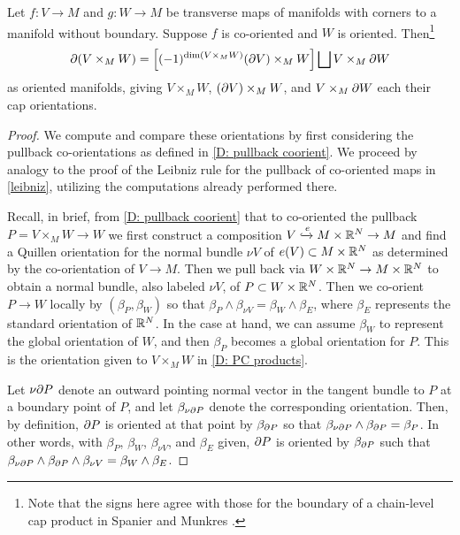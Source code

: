\begin{proposition}\label{P: Leibniz cap}
	Let $f \colon V \to M$ and $g \colon W \to M$ be transverse maps of manifolds with corners to a manifold without boundary.
	Suppose $f$ is co-oriented and $W$ is oriented.
	Then\footnote{Note that the signs here agree with those for the boundary of a chain-level cap product in Spanier \cite[Section 5.6.15]{Span81} and Munkres \cite[Section 66]{Mun84}.} $$\partial(V \times_M W) = \left[(-1)^{\dim(V \times_M W)} (\partial V) \times_M W\right] \bigsqcup V \times_M \partial W$$
	as oriented manifolds, giving $V \times_M W$, $(\partial V) \times_M W$, and $V \times_M \partial W$ each their cap orientations.
\end{proposition}

\begin{proof}
	We compute and compare these orientations by first considering the pullback co-orientations as defined in \cref{D: pullback coorient}.
	We proceed by analogy to the proof of the Leibniz rule for the pullback of co-oriented maps in \cref{leibniz}, utilizing the computations already performed there.

	Recall, in brief, from \cref{D: pullback coorient} that to co-oriented the pullback $P = V \times_M W \to W$ we first construct a composition $V \xhookrightarrow{e} M \times \mathbb{R}^N \to M$ and find a Quillen orientation for the normal bundle $\nu V$ of $e(V) \subset M \times \mathbb{R}^N$ as determined by the co-orientation of $V \to M$.
	Then we pull back via $W \times \mathbb{R}^N \to M \times \mathbb{R}^N$ to obtain a normal bundle, also labeled $\nu V$, of $P \subset W \times \mathbb{R}^N$.
	Then we co-orient $P \to W$ locally by $(\beta_P,\beta_W)$ so that $\beta_P \wedge \beta_{\nu V} = \beta_W \wedge \beta_E$, where $\beta_E$ represents the standard orientation of $\mathbb{R}^N$.
	In the case at hand, we can assume $\beta_W$ to represent the global orientation of $W$, and then $\beta_P$ becomes a global orientation for $P$.
	This is the orientation given to $V \times_M W$ in \cref{D: PC products}.

	Let $\nu\partial P$ denote an outward pointing normal vector in the tangent bundle to $P$ at a boundary point of $P$, and let $\beta_{\nu\partial P}$ denote the corresponding orientation.
	Then, by definition, $\partial P$ is oriented at that point by $\beta_{\partial P}$ so that $\beta_{\nu\partial P} \wedge \beta_{\partial P} = \beta_P$.
	In other words, with $\beta_P$, $\beta_W$, $\beta_{\nu V}$, and $\beta_E$ given, $\partial P$ is oriented by $\beta_{\partial P}$ such that $\beta_{\nu\partial P} \wedge \beta_{\partial P} \wedge \beta_{\nu V} = \beta_W \wedge \beta_E$.


\end{proof}
